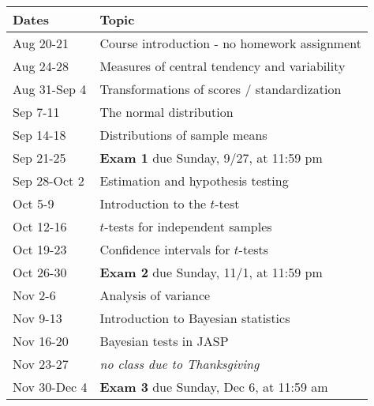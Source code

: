 \documentclass[10pt]{article}
\begin{document}
\begin{center}
\begin{tabular}{ll}
Dates & Topic\\
\hline
Aug 20-21 & Course introduction - no homework assignment\\
Aug 24-28 & Measures of central tendency and variability\\
Aug 31-Sep 4 & Transformations of scores / standardization\\
Sep 7-11 & The normal distribution\\
Sep 14-18 & Distributions of sample means\\
Sep 21-25 & \textbf{Exam 1} due Sunday, 9/27, at 11:59 pm\\
Sep 28-Oct 2 & Estimation and hypothesis testing\\
Oct 5-9 & Introduction to the \(t\)-test\\
Oct 12-16 & \(t\)-tests for independent samples\\
Oct 19-23 & Confidence intervals for \(t\)-tests\\
Oct 26-30 & \textbf{Exam 2} due Sunday, 11/1, at 11:59 pm\\
Nov 2-6 & Analysis of variance\\
Nov 9-13 & Introduction to Bayesian statistics\\
Nov 16-20 & Bayesian tests in JASP\\
Nov 23-27 & \emph{no class due to Thanksgiving}\\
Nov 30-Dec 4 & \textbf{Exam 3} due Sunday, Dec 6, at 11:59 am\\
\end{tabular}
\end{center}
\end{document}
